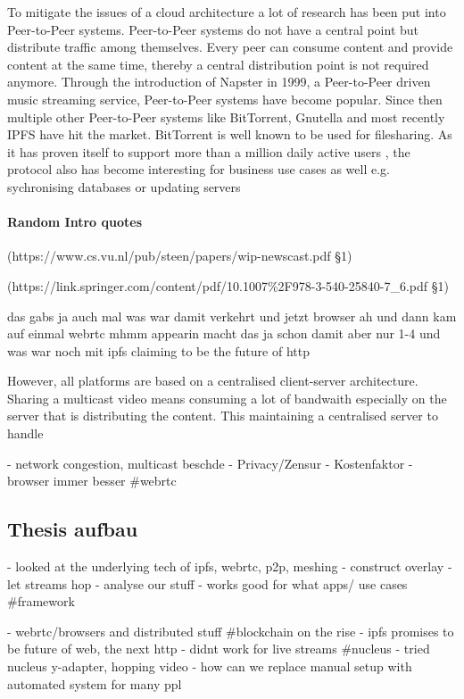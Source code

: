 To mitigate the issues of a cloud architecture a lot of research has been put into Peer-to-Peer systems. Peer-to-Peer systems do not have a central point but distribute traffic among themselves. Every peer can consume content and provide content at the same time, thereby a central distribution point is not required anymore. Through the introduction of Napster in 1999, a Peer-to-Peer driven music streaming service, Peer-to-Peer systems have become popular. Since then multiple other Peer-to-Peer systems like BitTorrent, Gnutella and most recently IPFS have hit the market. BitTorrent is well known to be used for filesharing. As it has proven itself to support more than a million daily active users \cite{bittorrent-stats}, the protocol also has become interesting for business use cases as well e.g. sychronising databases or updating servers


\paragraph{Random Intro quotes}
 (https://www.cs.vu.nl/pub/steen/papers/wip-newscast.pdf \S1)

(https://link.springer.com/content/pdf/10.1007\%2F978-3-540-25840-7\_6.pdf \S1)

das gabs ja auch mal
was war damit verkehrt
und jetzt browser
ah und dann kam auf einmal webrtc
mhmm appearin macht das ja schon damit aber nur 1-4
und was war noch mit ipfs claiming to be the future of http

However, all platforms are based on a centralised client-server architecture. Sharing a multicast video means consuming a lot of bandwaith especially on the server that is distributing the content. This maintaining a centralised server to handle 

- network congestion, multicast beschde
- Privacy/Zensur
- Kostenfaktor
- browser immer besser #webrtc



\subsection{Thesis aufbau}
- looked at the underlying tech of ipfs, webrtc, p2p, meshing
- construct overlay
- let streams hop
- analyse our stuff
- works good for what apps/ use cases #framework


- webrtc/browsers and distributed stuff #blockchain on the rise
- ipfs promises to be future of web, the next http
- didnt work for live streams #nucleus
- tried nucleus y-adapter, hopping video
- how can we replace manual setup with automated system for many ppl
